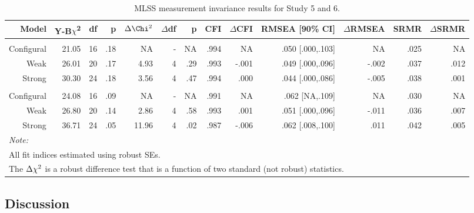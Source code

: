 \documentclass[
  12pt,
  a4paper,
]{book}
\begin{document}
\begin{landscape}\begin{table}

\caption{\label{tab:efficacy-mi}MLSS measurement invariance results for Study 5 and 6.}
\centering
\begin{tabular}[t]{rrrrrrrrrrrrr}
\toprule
Model & Y-B$\chi$\textsuperscript{2} & df & p & $\Delta\Chi\textsuperscript{2}$ & $\Delta$df & p & CFI & $\Delta$CFI & RMSEA [90\% CI] & $\Delta$RMSEA & SRMR & $\Delta$SRMR\\
\midrule
\addlinespace[0.3em]
\multicolumn{13}{l}{\textbf{Study 5}}\\
\hspace{1em}Configural & 21.05 & 16 & .18 & NA & - & NA & .994 & NA & .050 [.000,.103] & NA & .025 & NA\\
\hspace{1em}Weak & 26.01 & 20 & .17 & 4.93 & 4 & .29 & .993 & -.001 & .049 [.000,.096] & -.002 & .037 & .012\\
\hspace{1em}Strong & 30.30 & 24 & .18 & 3.56 & 4 & .47 & .994 & .000 & .044 [.000,.086] & -.005 & .038 & .001\\
\addlinespace[0.3em]
\multicolumn{13}{l}{\textbf{Study 6}}\\
\hspace{1em}Configural & 24.08 & 16 & .09 & NA & - & NA & .991 & NA & .062 [NA,.109] & NA & .030 & NA\\
\hspace{1em}Weak & 26.80 & 20 & .14 & 2.86 & 4 & .58 & .993 & .001 & .051 [.000,.096] & -.011 & .036 & .007\\
\hspace{1em}Strong & 36.71 & 24 & .05 & 11.96 & 4 & .02 & .987 & -.006 & .062 [.008,.100] & .011 & .042 & .005\\
\bottomrule
\multicolumn{13}{l}{\textit{Note: }}\\
\multicolumn{13}{l}{All fit indices estimated using robust SEs.}\\
\multicolumn{13}{l}{The $\Delta\chi\textsuperscript{2}$ is a robust difference test that is a function of two standard (not robust) statistics.}\\
\end{tabular}
\end{table}
\end{landscape}

\hypertarget{study5-discussion}{%
\subsection{Discussion}\label{study5-discussion}}
\end{document}
